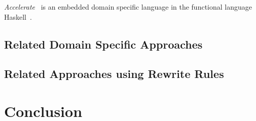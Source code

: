 
\emph{Accelerate}~\cite{} is an embedded domain specific language in the functional language Haskell~\cite{}.




\subsection{Related Domain Specific Approaches}


\subsection{Related Approaches using Rewrite Rules}

\section{Conclusion}


